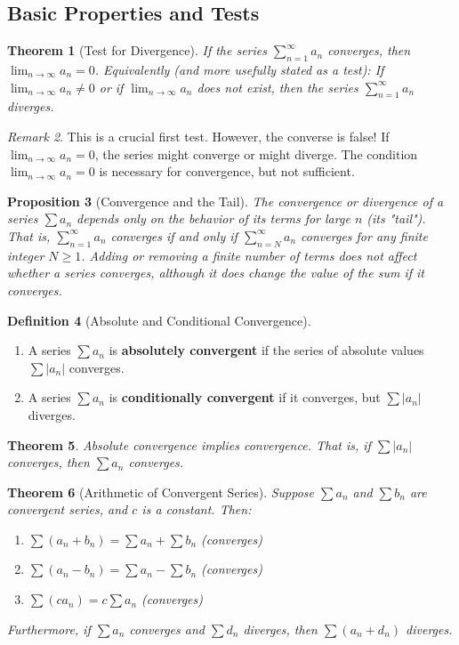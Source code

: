 \documentclass[11pt]{article}
\newtheorem{theorem}{Theorem}[section]
\newtheorem{proposition}[theorem]{Proposition}
\theoremstyle{definition}
\newtheorem{definition}[theorem]{Definition}
\theoremstyle{remark}
\newtheorem{remark}[theorem]{Remark}
\begin{document}
\subsection{Basic Properties and Tests}

\begin{theorem}[Test for Divergence] \label{thm:divergence_test}
If the series $\sum_{n=1}^\infty a_n$ converges, then $\lim_{n\to\infty} a_n = 0$.
Equivalently (and more usefully stated as a test):
If $\lim_{n\to\infty} a_n \neq 0$ or if $\lim_{n\to\infty} a_n$ does not exist, then the series $\sum_{n=1}^\infty a_n$ diverges.
\end{theorem}

\begin{remark}
This is a crucial first test. However, the converse is false! If $\lim_{n\to\infty} a_n = 0$, the series might converge or might diverge. The condition $\lim_{n\to\infty} a_n = 0$ is necessary for convergence, but not sufficient.
\end{remark}

\begin{proposition}[Convergence and the Tail]
The convergence or divergence of a series $\sum a_n$ depends only on the behavior of its terms for large $n$ (its "tail"). That is, $\sum_{n=1}^\infty a_n$ converges if and only if $\sum_{n=N}^\infty a_n$ converges for any finite integer $N \ge 1$. Adding or removing a finite number of terms does not affect whether a series converges, although it does change the value of the sum if it converges.
\end{proposition}

\begin{definition}[Absolute and Conditional Convergence]
\begin{enumerate}
    \item A series $\sum a_n$ is \textbf{absolutely convergent} if the series of absolute values $\sum |a_n|$ converges.
    \item A series $\sum a_n$ is \textbf{conditionally convergent} if it converges, but $\sum |a_n|$ diverges.
\end{enumerate}
\end{definition}

\begin{theorem}
Absolute convergence implies convergence. That is, if $\sum |a_n|$ converges, then $\sum a_n$ converges.
\end{theorem}

\begin{theorem}[Arithmetic of Convergent Series]
Suppose $\sum a_n$ and $\sum b_n$ are convergent series, and $c$ is a constant. Then:
\begin{enumerate}
    \item $\sum (a_n + b_n) = \sum a_n + \sum b_n$ (converges)
    \item $\sum (a_n - b_n) = \sum a_n - \sum b_n$ (converges)
    \item $\sum (c a_n) = c \sum a_n$ (converges)
\end{enumerate}
Furthermore, if $\sum a_n$ converges and $\sum d_n$ diverges, then $\sum (a_n + d_n)$ diverges.
\end{theorem}
\end{document}
